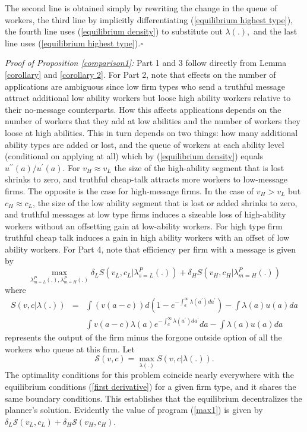 \documentclass[12pt]{article}
\begin{document}
The second line is obtained simply by rewriting the change in the queue of
workers, the third line by implicitly differentiating (\ref{equilibrium
highest type}), the fourth line uses (\ref{equilibrium density}) to
substitute out $\lambda (.),$ and the last line uses (\ref{equilibrium
highest type}).$\square $

\bigskip \bigskip

\noindent \textit{Proof of Proposition \ref{comparison1}:} Part 1 and 3 follow
directly from Lemma \ref{corollary} and \ref{corollary 2}. For Part 2, note
that effects on the number of applications are ambiguous since low firm
types who send a truthful message attract additional low ability workers but loose high ability workers relative to their no-message counterparts.
How this affects applications depends on the number of workers that they add at low abilities and the number of workers they loose at high abilities. This in turn depends on two things: how many additional ability types are added or lost, and the queue of workers at each ability level (conditional on applying at all) which by
(\ref{equilibrium density}) equals $u^{\prime \prime }(a)/u^{\prime }(a)$. For $v_{H}\approx v_{L}$ the size of the high-ability segment that is lost shrinks to zero, and
truthful cheap-talk attracts more workers to low-message firms. The opposite
is the case for high-message firms. In the case of $v_{H}> v_L$ but $c_H \approx c_L$, the size of the low ability segment that is lost or added shrinks to zero, and truthful messages at low type firms induces a sizeable loss of high-ability workers without an offsetting gain at low-ability workers. For high type firm truthful cheap talk induces a gain in high ability workers with an offset of low ability workers. For Part 4, note that efficiency per firm with a message is given by 
\begin{equation}
\max_{\lambda _{m=L}^{P}(.),\lambda _{m=H}^{P}(.)}\delta
_{L}S(v_{L},c_{L}|\lambda _{s=L}^{P}(.))+\delta _{H}S(v_{H},c_{H}|\lambda
_{m=H}^{P}(.))  \label{max1}
\end{equation}%
where 
\begin{eqnarray*}
S(v,c|\lambda (.)) &=&\int \left( v(a-c)\right) d\left(
1-e^{-\int_{a}^{\infty }\lambda (a^{\prime })da^{\prime }}\right) -\int
\lambda (a)u(a)da \\
&&\int v(a-c)\lambda (a)e^{-\int_{a}^{\infty }\lambda (a^{\prime
})da^{\prime }}da-\int \lambda (a)u(a)da
\end{eqnarray*}%
represents the output of the firm minus the forgone outside option of all
the workers who queue at this firm. Let 
\begin{equation}
\mathcal{S}(v,c)=\max_{\lambda (.)}S(v,c|\lambda (.)).  \label{max-by-type}
\end{equation}%
The optimality conditions for this problem coincide nearly everywhere with
the equilibrium conditions (\ref{first derivative}) for a given firm type,
and it shares the same boundary conditions. This establishes that the
equilibrium decentralizes the planner's solution. Evidently the value of
program (\ref{max1}) is given by $\delta _{L}\mathcal{S}(v_{L},c_{L})+\delta
_{H}\mathcal{S}(v_{H},c_{H}).$
\end{document}
